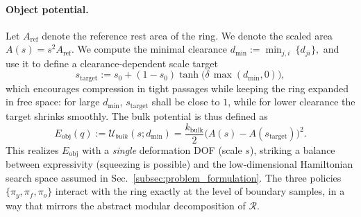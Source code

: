 \paragraph{Object potential.}

Let $A_{\text{ref}}$ denote the reference rest area of the ring. We denote the scaled area $A(s)= s^2 A_{\text{ref}}$.
We compute the minimal clearance \(d_{\min}:=\min_{j,i}~\{d_{ji}\},\)
and use it to define a clearance-dependent scale target 
\begin{equation}
s_{\text{target}}
:=
s_0 + (1-s_0)\tanh\big(\delta\,\max(d_{\min},0)\big),
\label{eq:def:radius:target}
\end{equation}
which encourages compression in tight passages while keeping the ring expanded in free space:
for large $d_{\min}$, $s_{\text{target}}$ shall be close to $1$, while for lower clearance the target shrinks smoothly.
The bulk potential is thus defined as
\begin{equation}
{E}_{\text{obj}}(q):=\mathcal{U}_{bulk}(s;d_{\min})
=
\frac{k_{\text{bulk}}}{2}\big(A(s) - A(s_{\text{target}})\big)^2.
\end{equation}
This realizes $E_{\mathrm{obj}}$ with a \emph{single} deformation DOF (scale $s$), striking a balance between expressivity (squeezing is possible) and the low-dimensional Hamiltonian search space assumed in Sec.~\ref{subsec:problem_formulation}. The three policies $\{\pi_y,\pi_f,\pi_o\}$ interact with the ring exactly at the level of boundary samples, in a way that mirrors the abstract modular decomposition of $\mathcal{R}$.

